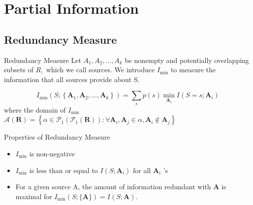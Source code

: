 \section{Partial Information}
\subsection{Redundancy Measure}
\begin{frame}{Redundancy Measure}
    Let $A_1, A_2, \ldots, A_k$ be nonempty and potentially overlapping
subsets of $R,$ which we call sources. We introduce $I_{\min}$ to measure the information that all sources provide about S.
\begin{definition}
\begin{equation}I_{\min }\left(S ;\left\{\mathbf{A}_{1}, \mathbf{A}_{2}, \ldots, \mathbf{A}_{k}\right\}\right)=\sum_{s} p(s) \min _{\mathbf{A}_{i}} I\left(S=s ; \mathbf{A}_{i}\right)\end{equation}
where the domain of $I_{\min}$ $\mathcal{A}(\mathbf{R})=\left\{\alpha \in \mathcal{P}_{1}\left(\mathcal{P}_{1}(\mathbf{R})\right): \forall \mathbf{A}_{i}, \mathbf{A}_{j} \in \alpha, \mathbf{A}_{i} \notin \mathbf{A}_{j}\right\}$
\end{definition}

\begin{block}{Properties of Redundancy Measure}
\begin{itemize}
    \item $I_{\min}$ is non-negative
    \item $I_{\min }$ is less than or equal to $I\left(S ; \mathbf{A}_{i}\right)$ for all $\mathbf{A}_{i}$ 's
    \item For a given source A, the amount of information redundant with $\mathbf{A}$ is maximal for $I_{\min }(S ;\{\mathbf{A}\})=I(S ; \mathbf{A}) .$
\end{itemize}
\end{block}
\end{frame}

